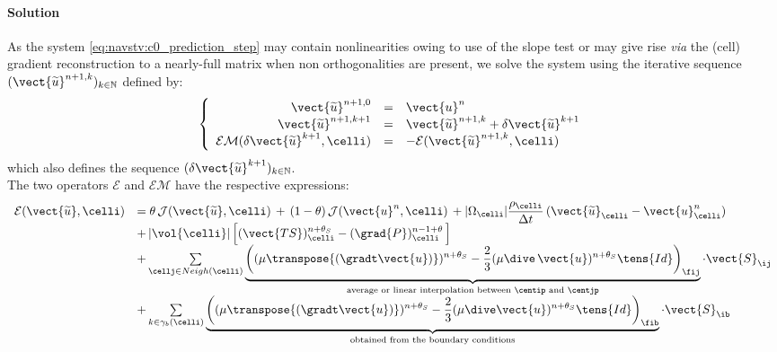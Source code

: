 \paragraph{Solution\\}
As the system \eqref{eq:navstv:c0_prediction_step} may contain nonlinearities
owing to use of the slope test or may give rise {\it via} the (cell) gradient
reconstruction to a nearly-full matrix when non orthogonalities are present,
we solve the system using the iterative sequence
$(\vect{\widetilde{u}}^{n+1,k})_{k\in \mathbb{N}}$ defined by:
\begin{equation}
\left\{
\begin{array}{r c l}
\vect{\widetilde{u}}^{n+1,0} & = & \vect{u}^{n}\\
\vect{\widetilde{u}}^{n+1,k+1} & =& \vect{\widetilde{u}}^{n+1,k} + \delta\vect{\widetilde{u}}^{k+1}\\
\mathcal{EM}(\delta\vect{\widetilde{u}}^{k+1}, \celli) & =& -\mathcal{E}(\vect{\widetilde{u}}^{n+1,k}, \celli) \\
\end{array}\right.
\end{equation}
which also defines the sequence $(\delta\vect{\widetilde{u}}^{k+1})
_{k\in \mathbb{N}}$.\\
The two operators $\mathcal{E}$ and $\mathcal{EM}$ have the respective
expressions:
\begin{equation}\label{eq:navstv:exact_prediction_step}
\begin{array}{ll}
\mathcal{E}(\vect{\widetilde{u}}, \celli) &= \theta\, \mathcal{J}(\vect{\widetilde{u}}, \celli)\,+\,(1-\theta)\,\mathcal{J}(\vect{u}^{n}, \celli)\,+ |{\Omega_\celli}|\displaystyle\frac{\rho_\celli}{\Delta t}\,(\vect{\widetilde{u}}_{\celli}-\vect{u}^n_{\celli}) \\
& +\,|{\vol{\celli}}|\left[(\vect{TS})^{n+\theta_{S}}_\celli-(\grad{P})^{n-1+\theta}_\celli \, \right]\\
&+\sum\limits_{\cellj \in Neigh(\celli)}{ \underbrace{\left(( \mu \transpose{\left(\gradt\vect{u}\right)})^{n+\theta_{S}}- \frac{2}{3} ( \mu \dive\,\vect{u})^{n+\theta_{S}}\tens{Id}\right)_{\fij}}_{\text{average or linear interpolation between $\centip$ and $\centjp$}} \cdot \vect{S}_{\ij}}\\
&+\sum\limits_{k\in {\gamma_b(\celli)}}{ \underbrace{\left(( \mu \transpose{\left( \gradt\vect{u}\right)} )^{n+\theta_{S}}- \frac{2}{3} ( \mu \dive \vect{u})^{n+\theta_{S}}\tens{Id}\right)_{\fib}}_\text{obtained from the boundary conditions} \cdot \vect{S}_{\ib}}\\
\end{array}
\end{equation}
